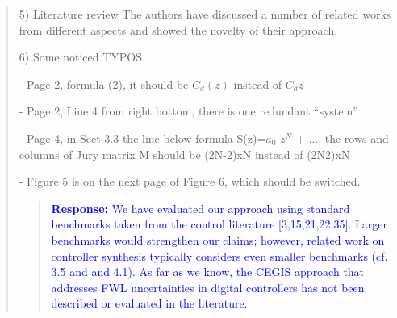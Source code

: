 \documentclass[11pt]{article}
\begin{document}
\begin{quote}
5) Literature review
The authors have discussed a number of related works from different aspects and showed the novelty of their approach.

6) Some noticed TYPOS

- Page 2, formula (2), it should be $C_d(z)$ instead of $C_dz$

- Page 2, Line 4 from right bottom, there is one redundant ``system''

- Page 4, in Sect 3.3 the line below formula S(z)=$a_0$ $z^N$ + $...$, the rows and columns of Jury matrix M should be (2N-2)xN instead of (2N2)xN

- Figure 5 is on the next page of Figure 6, which should be switched.

\begin{quote}
\textcolor{blue}{\textbf{Response:} We have evaluated our approach using standard benchmarks taken from the control literature [3,15,21,22,35]. Larger benchmarks would strengthen our claims; however, related work on controller synthesis typically considers even smaller benchmarks (cf. 3.5 and and 4.1). As far as we know, the CEGIS approach that addresses FWL uncertainties in digital controllers has not been described or evaluated in the literature.}
\end{quote}

\end{quote}

\label{LastPage}
\end{document}
